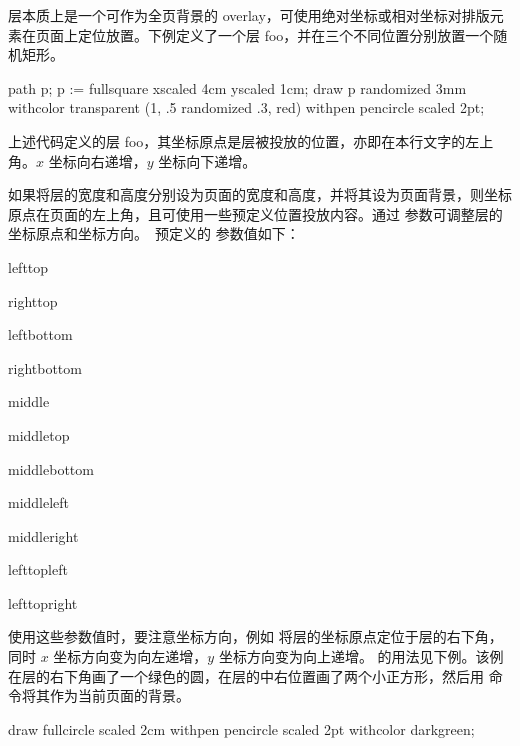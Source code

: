 层本质上是一个可作为全页背景的 overlay，可使用绝对坐标或相对坐标对排版元素在页面上定位放置。下例定义了一个层 foo，并在三个不同位置分别放置一个随机矩形。

path p;
p := fullsquare xscaled 4cm yscaled 1cm;
draw p randomized 3mm
       withcolor transparent (1, .5 randomized .3, red)
       withpen pencircle scaled 2pt;
\stopuseMPgraphic

\startexample
{}
\flushlayer[foo]
\stopexample
\simpleexample[option=TEX]{\null}
\getexample

\noindent 上述代码定义的层 foo，其坐标原点是层被投放的位置，亦即在本行文字的左上角。$x$ 坐标向右递增，$y$ 坐标向下递增。

如果将层的宽度和高度分别设为页面的宽度和高度，并将其设为页面背景，则坐标原点在页面的左上角，且可使用一些预定义位置投放内容。通过  参数可调整层的坐标原点和坐标方向。\CONTEXT\ 预定义的  参数值如下：

\item lefttop\item righttop\item leftbottom\item rightbottom\item middle\item middletop
\item middlebottom\item middleleft\item middleright\item lefttopleft\item lefttopright
\stopitemize

\noindent 使用这些参数值时，要注意坐标方向，例如  将层的坐标原点定位于层的右下角，同时 $x$ 坐标方向变为向左递增，$y$ 坐标方向变为向上递增。 的用法见下例。该例在层的右下角画了一个绿色的圆，在层的中右位置画了两个小正方形，然后用  命令将其作为当前页面的背景。

\startexample
draw fullcircle scaled 2cm withpen pencircle scaled 2pt withcolor darkgreen;
\stopuniqueMPgraphic
{}
\setupbackgrounds[page][background={foo, bar}]
\stopexample
\simpleexample[option=TEX]{\null}
\getexample

